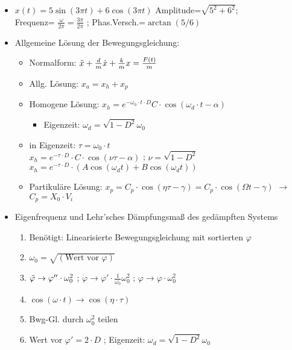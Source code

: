 \documentclass[fleqn,twoside]{article}
\begin{document}
\begin{multicols*}{3}
\begin{itemize}
     \item $x(t)=5\sin(3\pi t)+6 \cos(3\pi t)$ Amplitude=$\sqrt{5^2+6^2}$;\\Frequenz= $\frac{\omega}{2\pi}=\frac{3\pi}{2\pi}$ ; Phas.Versch.=$\arctan(5/6)$

     \item Allgemeine Lösung der Bewegungsgleichung:
     \begin{itemize}
         \item Normalform: $\Ddot{x}+\frac{d}{m}\Dot{x}+\frac{k}{m}x=\frac{F(t)}{m}$
         \item Allg. Lösung: $x_a=x_h+x_p$
         \item Homogene Lösung: $x_h=e^{-\omega_0\cdot t\cdot D} C \cdot \cos(\omega_d \cdot t - \alpha)$
             \begin{itemize}
                \item Eigenzeit: $\omega_d=\sqrt{1-D^2}\omega_0$
             \end{itemize}
         \item in Eigenzeit: $\tau=\omega_0 \cdot t$ \\ 
         $x_h=e^{-\tau \cdot D}\cdot C \cdot \cos(\nu \tau - \alpha)$ ; $\nu = \sqrt{1-D^2}$\\
         $x_h=e^{-\tau \cdot D}\cdot (A \cos(\omega_d t) + B \cos(\omega_d t))$
         \item Partikuläre Lösung: $x_p = C_p \cdot \cos(\eta \tau - \gamma) = C_p \cdot \cos(\Omega t - \gamma)$ $\rightarrow$ $C_p=X_0\cdot V_i$
     \end{itemize}
     \item Eigenfrequenz und Lehr'sches Dämpfungsmaß des gedämpften Systems
        \begin{enumerate}
            \item Benötigt: Linearisierte Bewegungsgleichung mit sortierten $\varphi$
            \item $\omega_0 = \sqrt{(\text{Wert vor } \varphi)}$
            \item $\Ddot{\varphi} \rightarrow \varphi'' \cdot \omega_0^2$ ; $\dot{\varphi} \rightarrow \varphi' \cdot \frac{1}{\omega_0} \omega_0^2$ ;
            $\varphi \rightarrow \varphi \cdot \omega^2_0$
            \item $\cos{(\omega \cdot t)} \rightarrow \cos{(\eta \cdot \tau)}$
            \item Bwg-Gl. durch $\omega_0^2$ teilen
            \item Wert vor $\varphi' = 2\cdot D$ ;
            Eigenzeit: $\omega_d=\sqrt{1-D^2}\omega_0$

\end{enumerate}
\end{itemize}
\end{multicols*}
\end{document}
